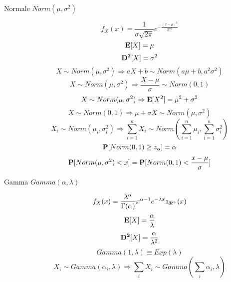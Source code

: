 \begin{description}
	\item[Normale $Norm(\mu,\sigma^{2})$]
		\begin{equation}
		f_{X}(x)=\frac{1}{\sigma\sqrt{2\pi}}e^{-\frac{(x-\mu)^{2}}{2\sigma^{2}}}
		\end{equation}
		\begin{equation}
		\mathbf{E}[X]=\mu
		\end{equation}
		\begin{equation}
		\mathbf{D^{2}}[X]=\sigma^{2}
		\end{equation}
		\begin{equation}
		X\sim Norm(\mu,\sigma^{2}) \Rightarrow aX+b\sim Norm(a\mu +b,a^{2}\sigma^{2})
		\end{equation}
		\begin{equation}
		X\sim Norm(\mu,\sigma^{2}) \Rightarrow \frac{X-\mu}{\sigma}\sim Norm(0,1)
		\end{equation}
		\begin{equation}
		X\sim Norm(\mu,\sigma^{2}) \Rightarrow \mathbf{E}[X^{2}]=\mu^{2}+\sigma^{2}
		\end{equation}
		\begin{equation}
		X\sim Norm(0,1) \Rightarrow \mu + \sigma X \sim Norm(\mu,\sigma^{2})
		\end{equation}
		\begin{equation}
		X_{i}\sim Norm(\mu_{i},\sigma_{i}^{2}) \Rightarrow \sum_{i=1}^{n}X_{i} \sim Norm(\sum_{i=1}^{n}\mu_{i},\sum_{i=1}^{n}\sigma_{i}^{2})
		\end{equation}
		\begin{equation}
		\mathbf{P}[Norm(0,1)\geq z_{\alpha}]=\alpha
		\end{equation}
		\begin{equation}
		\mathbf{P}[Norm(\mu,\sigma^{2}) < x]=\mathbf{P}[Norm(0,1) < \frac{x-\mu}{\sigma}]
		\end{equation}
		
	\item[Gamma $Gamma(\alpha,\lambda)$]
		\begin{equation}
		f_{X}(x)=\frac{\lambda^{\alpha}}{\Gamma(\alpha)}x^{\alpha-1}e^{-\lambda x}\mathfrak{1}_{\Re^{+}}(x)
		\end{equation}
		\begin{equation}
		\mathbf{E}[X]=\frac{\alpha}{\lambda}
		\end{equation}
		\begin{equation}
		\mathbf{D^{2}}[X]=\frac{\alpha}{\lambda^{2}}
		\end{equation}
		\begin{equation}
		Gamma(1,\lambda) \equiv Exp(\lambda)
		\end{equation}
		\begin{equation}
		X_{i}\sim Gamma(\alpha_{i},\lambda)\Rightarrow \sum_{i}X_{i}\sim Gamma(\sum_{i}\alpha_{i},\lambda)
		\end{equation}
		

\end{description}

